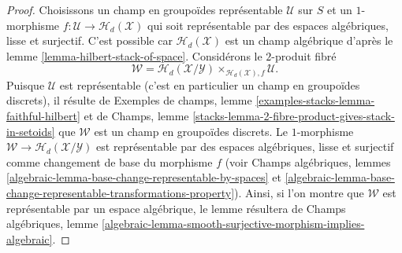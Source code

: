\begin{proof}
Choisissons un champ en groupoïdes représentable $\mathcal{U}$ sur $S$ et un
$1$-morphisme $f : \mathcal{U} \to \mathcal{H}_d(\mathcal{X})$
qui soit représentable par des espaces algébriques, lisse et surjectif.
C'est possible car $\mathcal{H}_d(\mathcal{X})$ est un champ algébrique d'après le
lemme \ref{lemma-hilbert-stack-of-space}.
Considérons le $2$-produit fibré
$$
\mathcal{W} =
\mathcal{H}_d(\mathcal{X}/\mathcal{Y})
\times_{\mathcal{H}_d(\mathcal{X}), f}
\mathcal{U}.
$$
Puisque $\mathcal{U}$ est représentable (c'est en particulier un champ en
groupoïdes discrets), il résulte de
Exemples de champs, lemme \ref{examples-stacks-lemma-faithful-hilbert}
et de
Champs, lemme \ref{stacks-lemma-2-fibre-product-gives-stack-in-setoids}
que $\mathcal{W}$ est un champ en groupoïdes discrets. Le $1$-morphisme
$\mathcal{W} \to \mathcal{H}_d(\mathcal{X}/\mathcal{Y})$ est
représentable par des espaces algébriques, lisse et surjectif comme changement
de base du morphisme $f$ (voir
Champs algébriques,
lemmes \ref{algebraic-lemma-base-change-representable-by-spaces} et
\ref{algebraic-lemma-base-change-representable-transformations-property}).
Ainsi, si l'on montre que $\mathcal{W}$ est représentable par un espace algébrique,
le lemme résultera de
Champs algébriques,
lemme \ref{algebraic-lemma-smooth-surjective-morphism-implies-algebraic}.


\end{proof}
